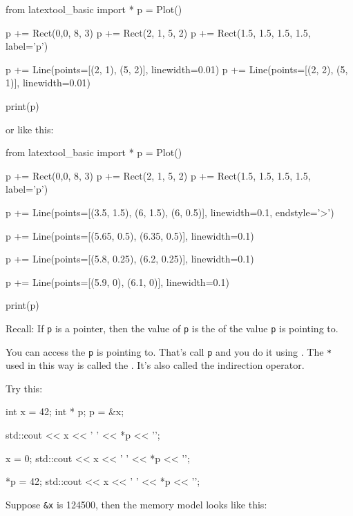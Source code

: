 \begin{python}
from latextool_basic import *
p = Plot()

p += Rect(0,0, 8, 3)
p += Rect(2, 1, 5, 2)
p += Rect(1.5, 1.5, 1.5, 1.5, label='p')

p += Line(points=[(2, 1), (5, 2)], linewidth=0.01)
p += Line(points=[(2, 2), (5, 1)], linewidth=0.01)

print(p)
\end{python}

or like this:

\begin{python}
from latextool_basic import *
p = Plot()

p += Rect(0,0, 8, 3)
p += Rect(2, 1, 5, 2)
p += Rect(1.5, 1.5, 1.5, 1.5, label='p')

p += Line(points=[(3.5, 1.5), (6, 1.5), (6, 0.5)], linewidth=0.1, endstyle='>')

p += Line(points=[(5.65, 0.5), (6.35, 0.5)], linewidth=0.1)

p += Line(points=[(5.8, 0.25), (6.2, 0.25)], linewidth=0.1)

p += Line(points=[(5.9, 0), (6.1, 0)], linewidth=0.1)

print(p)
\end{python}


\newpage{}

Recall: If \texttt{p} is a pointer, then the value of \texttt{p} is the  of the value \texttt{p} is pointing to.

You can access the  \texttt{p} is pointing to. That's call  \texttt{p} and you do it using . The \texttt{*} used in this way is called the . It's also called the indirection operator.

Try this:

\begin{consolethree}[escapeinside=||]
int x = 42;
int * p;
p = \&x;

std::cout << x << ' ' << *p << '\n';

x = 0;
std::cout << x << ' ' << *p << '\n';

*p = 42;
std::cout << x << ' ' << *p << '\n';
\end{consolethree}
Suppose \texttt{\&x} is 124500, then the memory model looks like this:

